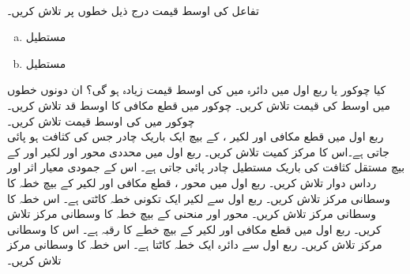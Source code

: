\\
تفاعل  کی اوسط قیمت درج ذیل خطوں پر تلاش کریں۔
\begin{enumerate}[a.]
\item
مستطیل 
\item
مستطیل 
\end{enumerate}
کیا چوکور  یا ربع اول میں دائرہ   میں   کی اوسط قیمت زیادہ ہو گی؟ ان دونوں خطوں میں اوسط کی قیمت تلاش کریں۔
چوکور  میں قطع مکافی  کا  اوسط قد تلاش کریں۔
چوکور  میں  کی اوسط قیمت تلاش کریں۔
\\
ربع اول میں قطع مکافی  اور لکیر ،  کے بیچ ایک باریک چادر جس کی کثافت  ہو  پائی جاتی ہے۔اس کا مرکز کمیت تلاش کریں۔
ربع اول میں محددی محور اور  لکیر  اور   کے بیچ  مستقل کثافت کی باریک  مستطیل چادر پائی جاتی ہے۔ اس کے جمودی  معیار اثر اور رداس دوار تلاش کریں۔
ربع اول میں محور ، قطع مکافی  اور لکیر  کے بیچ خطہ کا وسطانی مرکز تلاش کریں۔
ربع اول سے لکیر  ایک تکونی خطہ کاٹتی ہے۔ اس خطہ کا وسطانی مرکز تلاش کریں۔
محور  اور  منحنی  کے بیچ خطہ کا وسطانی مرکز تلاش کریں۔
ربع اول میں قطع مکافی   اور لکیر  کے بیچ خطے کا رقبہ  ہے۔ اس کا وسطانی مرکز تلاش کریں۔
ربع اول سے دائرہ   ایک خطہ کاٹتا ہے۔ اس خطہ کا وسطانی مرکز تلاش کریں۔
